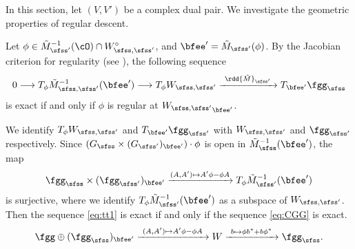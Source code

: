\documentclass[12pt,a4paper]{amsart}
\newcommand{\X}{\mathbf{X}}
\numberwithin{equation}{section}
\theoremstyle{remark}
\def\cOp{\cO^{\prime}}
\begin{document}
\def\Ks{{K}_{\sfss}}
\def\Ksp{{K}_{\sfss'}}
\def\Kspo{{K}_{\sfss'_0}}
\def\Kspt{{K}_{\sfss'_1}}

\def\Gs{{G}_{\sfss}}
\def\Gsp{{G}_{\sfss'}}
\def\Gspo{{G}_{\sfss'_0}}
\def\Gspt{{G}_{\sfss'_1}}
\def\CMs{{\tilde M}_{\sfss}}
\def\CMsp{{\tilde M}_{\sfss'}}
\def\CMss{{\tilde M}_{\sfss,\sfss'}}
\def\Wss{{W_{\sfss,\sfss'}}}
\def\Woss{{W^{\circ}_{\sfss,\sfss'}}}
\def\CXss{\cX_{\sfss,\sfss'}}
\def\X{\bfee}
\def\Xp{{\bfee'}}
\def\Xpo{{\bfee'_0}}
\def\ww{\phi}
\def\wwo{\phi_0}
\def\sOp{\sO'}
\def\fggpsb{{\fgg^{\boxslash}_{\sfss'}}}
\def\fpppsb{{\fpp^{\boxslash}_{\sfss'}}}
\def\fpppso{\fpp_{\sfss'_0}}
\def\fpppst{\fpp_{\sfss'_1}}

\def\Vs{V_\sfss}
\def\Vsp{V_{\sfss'}}
\def\Vspp{V_{\sfss''}}
\def\Vspo{V_{\sfss'_0}}
\def\Vspt{V_{\sfss'_1}}
\def\Vspi{V_{\sfss'_i}}
\def\Wssi{W_{\sfss,\sfss'_i}}
\def\Wsso{W_{\sfss,\sfss'_0}}
\def\Wsst{W_{\sfss,\sfss'_1}}

\def\CXUO{\cX_{\sfss,\sfss'}^{\bar\partial ,\cOp}}
\def\CXOO{\cX_{\sfss,\sfss'}^{\cO ,\cOp}}

In this section, let $(V,V')$ be a complex dual
pair. %
We investigate the geometric properties of regular descent.


Let $\ww\in \CMsp^{{-1}}(\cO)\cap \Woss$, and $\Xp = \CMsp(\ww)$.
By the Jacobian criterion for
regularity (see \cite[Theorem~2.19]{LiuAG}), the following sequence
\begin{equation}\label{eq:tt1}
  0\longrightarrow T_{\ww} \CMss^{{-1}}(\Xp) \longrightarrow T_{\ww} \Wss \xrightarrow{\ \rdd \CMsp \ } T_{\Xp}\fggs \end{equation}
is exact if and only if $\ww$ is regular at $\Wss_{\Xp}$.

We identify  $T_{\ww}\Wss$ and $T_{\Xp}\fggsp$ with $\Wss$ and $\fggsp$
respectively. Since $(\Gs\times (\Gsp)_{\Xp})\cdot \ww$ is open in $\CMs^{{-1}}(\Xp)$,
the map
\[
  \fggs\times (\fggsp)_{\Xp}\xrightarrow{(A,A')\mapsto A'\ww - \ww A} T_{\ww}\CMsp^{-1}(\Xp)
\]
is surjective, where we identify $T_{\ww}\CMsp^{-1}(\Xp)$ as a subspace of $\Wss$.
Then the sequence \eqref{eq:tt1}
is exact if and only if the sequence \eqref{eq:CGG} is exact.
\begin{equation}\label{eq:CGG}
  \fgg\oplus (\fggs)_{\Xp} \xrightarrow{\ (A,A')\mapsto A'\ww - \ww A \ } W
  \xrightarrow{\ b\mapsto \ww b^{*} + b\ww^{*}\  } \fggs.
\end{equation}
\end{document}
